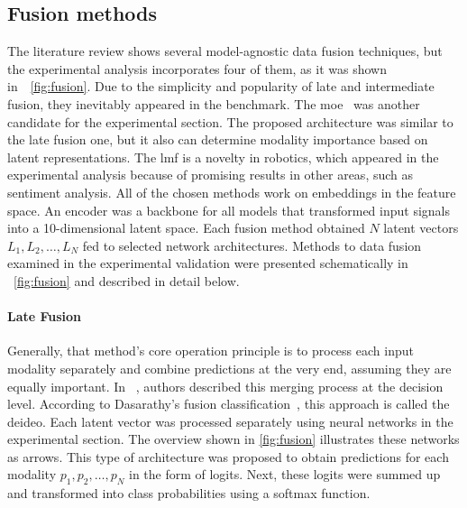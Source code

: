 \documentclass[a4paper, 10pt, twoside]{report}
\begin{document}
\subsection{Fusion methods}
\label{part:methods:fusion:multimodal:approaches}

The literature review shows several model-agnostic data fusion techniques, but the experimental analysis incorporates four of them, as it was shown in~\Figure~\ref{fig:fusion}. Due to the simplicity and popularity of late and intermediate fusion, they inevitably appeared in the benchmark. The \acrfull{moe}~\cite{late_supervised} was another candidate for the experimental section. The proposed architecture was similar to the late fusion one, but it also can determine modality importance based on latent representations. The \acrfull{lmf} is a novelty in robotics, which appeared in the experimental analysis because of promising results in other areas, such as sentiment analysis. All of the chosen methods work on embeddings in the feature space. An encoder was a backbone for all models that transformed input signals into a 10-dimensional latent space. Each fusion method obtained $N$ latent vectors $L_1, L_2, \ldots, L_N$ fed to selected network architectures. Methods to data fusion examined in the experimental validation were presented schematically in \Figure ~\ref{fig:fusion} and described in detail below.

\paragraph{Late Fusion} Generally, that method's core operation principle is to process each input modality separately and combine predictions at the very end, assuming they are equally important. In ~\cite{Castanedo2013ARO}, authors described this merging process at the decision level. According to Dasarathy's fusion classification~\cite{Dasarathycls}, this approach is called the \acrfull{deideo}. Each latent vector was processed separately using neural networks in the experimental section. The overview shown in \Figure\ref{fig:fusion} illustrates these networks as arrows. This type of architecture was proposed to obtain predictions for each modality $p_1, p_2, \ldots, p_N$ in the form of logits. Next, these logits were summed up and transformed into class probabilities using a softmax function.
\end{document}
